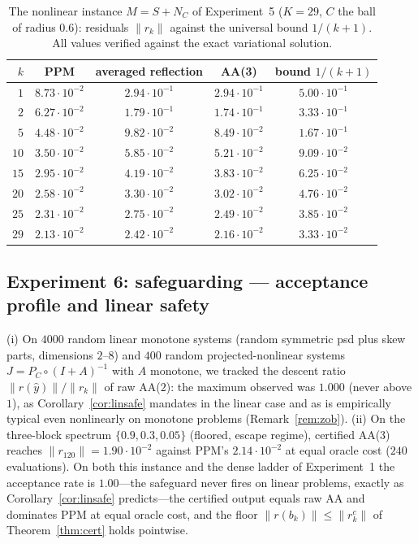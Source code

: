 \documentclass[11pt]{article}
\theoremstyle{definition}
\theoremstyle{remark}
\newcommand{\norm}[1]{\| #1 \|}
\begin{document}
\begin{table}[htbp]
\centering\small
\caption{The nonlinear instance $M=S+N_C$ of Experiment~5 ($K=29$, $C$ the
ball of radius $0.6$): residuals $\norm{r_k}$ against the universal bound
$1/(k+1)$. All values verified against the exact variational solution.}
\label{tab:nonlin}
\begin{tabular}{rcccc}
\toprule
$k$ & PPM & averaged reflection & AA(3) & bound $1/(k+1)$\\
\midrule
$1$  & $8.73\cdot10^{-2}$ & $2.94\cdot10^{-1}$ & $2.94\cdot10^{-1}$ & $5.00\cdot10^{-1}$\\
$2$  & $6.27\cdot10^{-2}$ & $1.79\cdot10^{-1}$ & $1.74\cdot10^{-1}$ & $3.33\cdot10^{-1}$\\
$5$  & $4.48\cdot10^{-2}$ & $9.82\cdot10^{-2}$ & $8.49\cdot10^{-2}$ & $1.67\cdot10^{-1}$\\
$10$ & $3.50\cdot10^{-2}$ & $5.85\cdot10^{-2}$ & $5.21\cdot10^{-2}$ & $9.09\cdot10^{-2}$\\
$15$ & $2.95\cdot10^{-2}$ & $4.19\cdot10^{-2}$ & $3.83\cdot10^{-2}$ & $6.25\cdot10^{-2}$\\
$20$ & $2.58\cdot10^{-2}$ & $3.30\cdot10^{-2}$ & $3.02\cdot10^{-2}$ & $4.76\cdot10^{-2}$\\
$25$ & $2.31\cdot10^{-2}$ & $2.75\cdot10^{-2}$ & $2.49\cdot10^{-2}$ & $3.85\cdot10^{-2}$\\
$29$ & $2.13\cdot10^{-2}$ & $2.42\cdot10^{-2}$ & $2.16\cdot10^{-2}$ & $3.33\cdot10^{-2}$\\
\bottomrule
\end{tabular}
\end{table}

\subsection{Experiment 6: safeguarding --- acceptance profile and linear
safety}\label{sec:exp4}

(i) On $4000$ random linear monotone systems (random symmetric psd plus
skew parts, dimensions $2$--$8$) and $400$ random projected-nonlinear
systems $J=P_C\circ(I+A)^{-1}$ with $A$ monotone, we tracked the descent
ratio $\norm{r(\hat y)}/\norm{r_k}$ of raw AA($2$): the maximum observed
was $1.000$ (never above $1$), as Corollary~\ref{cor:linsafe} mandates in
the linear case and as is empirically typical even nonlinearly on monotone
problems (Remark~\ref{rem:zob}). (ii) On the three-block spectrum
$\{0.9,0.3,0.05\}$ (floored, escape regime), certified AA(3) reaches
$\norm{r_{120}}=1.90\cdot10^{-2}$ against PPM's $2.14\cdot10^{-2}$ at
equal oracle cost ($240$ evaluations). On both this instance and the dense
ladder of Experiment~1 the acceptance rate is $1.00$---the safeguard never
fires on linear problems, exactly as Corollary~\ref{cor:linsafe}
predicts---the certified output equals raw AA and dominates PPM at equal
oracle cost, and the floor $\norm{r(b_k)}\le\norm{r^c_k}$ of
Theorem~\ref{thm:cert} holds pointwise.
\end{document}
